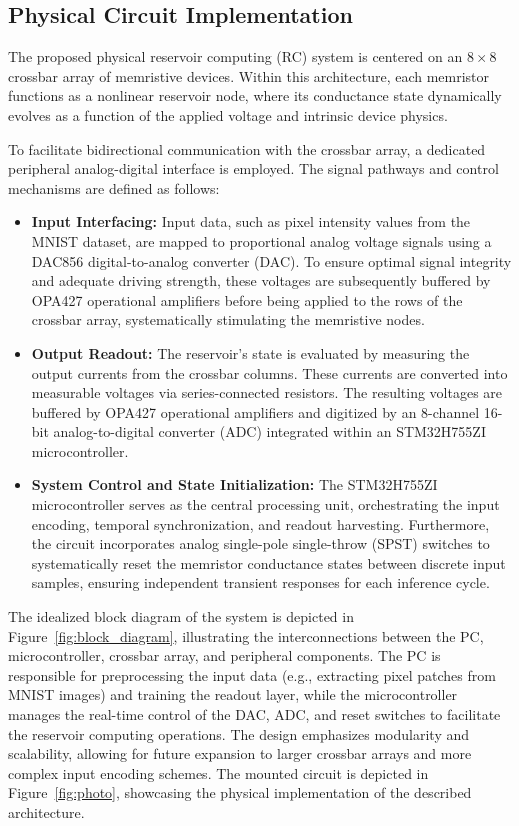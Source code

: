\documentclass[11pt, oneside]{article}
\begin{document}
\subsection{Physical Circuit Implementation}

The proposed physical reservoir computing (RC) system is centered on an \(8 \times 8\) crossbar array of memristive devices. Within this architecture, each memristor functions as a nonlinear reservoir node, where its conductance state dynamically evolves as a function of the applied voltage and intrinsic device physics.

To facilitate bidirectional communication with the crossbar array, a dedicated peripheral analog-digital interface is employed. The signal pathways and control mechanisms are defined as follows:
\begin{itemize}
    \item \textbf{Input Interfacing:} Input data, such as pixel intensity values from the MNIST dataset, are mapped to proportional analog voltage signals using a DAC856 digital-to-analog converter (DAC). To ensure optimal signal integrity and adequate driving strength, these voltages are subsequently buffered by OPA427 operational amplifiers before being applied to the rows of the crossbar array, systematically stimulating the memristive nodes.
    \item \textbf{Output Readout:} The reservoir's state is evaluated by measuring the output currents from the crossbar columns. These currents are converted into measurable voltages via series-connected resistors. The resulting voltages are buffered by OPA427 operational amplifiers and digitized by an 8-channel 16-bit analog-to-digital converter (ADC) integrated within an STM32H755ZI microcontroller.
    \item \textbf{System Control and State Initialization:} The STM32H755ZI microcontroller serves as the central processing unit, orchestrating the input encoding, temporal synchronization, and readout harvesting. Furthermore, the circuit incorporates analog single-pole single-throw (SPST) switches to systematically reset the memristor conductance states between discrete input samples, ensuring independent transient responses for each inference cycle.
\end{itemize}


The idealized block diagram of the system is depicted in Figure~\ref{fig:block_diagram}, illustrating the interconnections between the PC, microcontroller, crossbar array, and peripheral components. 
The PC is responsible for preprocessing the input data (e.g., extracting pixel patches from MNIST images) and training the readout layer, while the microcontroller manages the real-time control of the DAC, ADC, and reset switches to facilitate the reservoir computing operations. The design emphasizes modularity and scalability, allowing for future expansion to larger crossbar arrays and more complex input encoding schemes. The mounted circuit is depicted in Figure~\ref{fig:photo}, showcasing the physical implementation of the described architecture.
\end{document}
